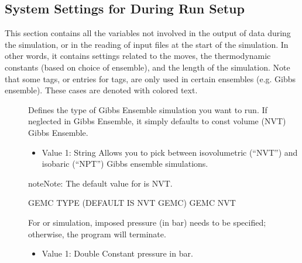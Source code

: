 \documentclass[letterpaper,10pt,english]{sphinxmanual}
\begin{document}
\subsection{System Settings for During Run Setup}
\label{\detokenize{input_file:system-settings-for-during-run-setup}}
This section contains all the variables not involved in the output of data during the simulation, or in the reading of input files at the start of the simulation. In other words, it contains settings related to the moves, the thermodynamic constants (based on choice of ensemble), and the length of the simulation.
Note that some tags, or entries for tags, are only used in certain ensembles (e.g. Gibbs ensemble). These cases are denoted with colored text.
\begin{description}
\item[{}] \leavevmode
{} Defines the type of Gibbs Ensemble simulation you want to run. If neglected in Gibbs Ensemble, it simply defaults to const volume (NVT) Gibbs Ensemble.
\begin{itemize}
\item {} 
Value 1: String \sphinxhyphen{} Allows you to pick between isovolumetric (“NVT”) and isobaric (“NPT”) Gibbs ensemble simulations.

\end{itemize}

\begin{sphinxadmonition}{note}{Note:}
The default value for  is NVT.
\end{sphinxadmonition}

\begin{sphinxVerbatim}[commandchars=\\\{\}]
\PYGZsh{}\PYGZsh{}\PYGZsh{}\PYGZsh{}\PYGZsh{}\PYGZsh{}\PYGZsh{}\PYGZsh{}\PYGZsh{}\PYGZsh{}\PYGZsh{}\PYGZsh{}\PYGZsh{}\PYGZsh{}\PYGZsh{}\PYGZsh{}\PYGZsh{}\PYGZsh{}\PYGZsh{}\PYGZsh{}\PYGZsh{}\PYGZsh{}\PYGZsh{}\PYGZsh{}\PYGZsh{}\PYGZsh{}\PYGZsh{}\PYGZsh{}\PYGZsh{}\PYGZsh{}\PYGZsh{}\PYGZsh{}\PYGZsh{}
\PYGZsh{} GEMC TYPE (DEFAULT IS NVT GEMC)
\PYGZsh{}\PYGZsh{}\PYGZsh{}\PYGZsh{}\PYGZsh{}\PYGZsh{}\PYGZsh{}\PYGZsh{}\PYGZsh{}\PYGZsh{}\PYGZsh{}\PYGZsh{}\PYGZsh{}\PYGZsh{}\PYGZsh{}\PYGZsh{}\PYGZsh{}\PYGZsh{}\PYGZsh{}\PYGZsh{}\PYGZsh{}\PYGZsh{}\PYGZsh{}\PYGZsh{}\PYGZsh{}\PYGZsh{}\PYGZsh{}\PYGZsh{}\PYGZsh{}\PYGZsh{}\PYGZsh{}\PYGZsh{}\PYGZsh{}
GEMC    NVT
\end{sphinxVerbatim}

\item[{}] \leavevmode
For  or  simulation, imposed pressure (in bar) needs to be specified; otherwise, the program will terminate.
\begin{itemize}
\item {} 
Value 1: Double \sphinxhyphen{} Constant pressure in bar.


\end{itemize}
\end{description}
\end{document}
